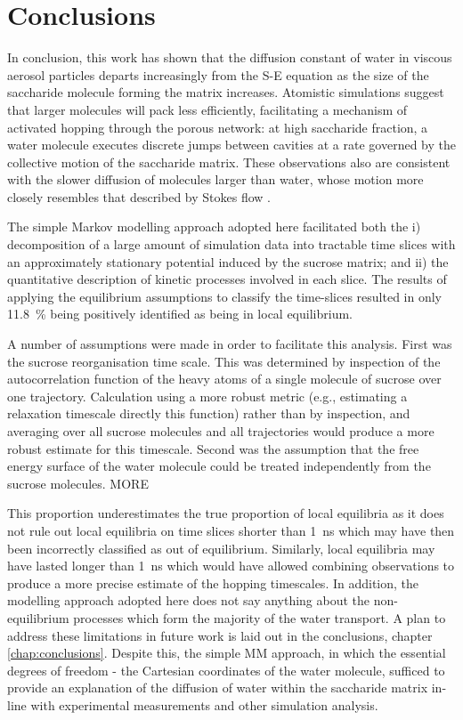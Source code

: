 \section{Conclusions}\label{sec:wat_conclusions}
In conclusion, this work has shown that the diffusion constant of water in viscous aerosol particles departs increasingly from the S-E equation as the size of the saccharide molecule forming the matrix increases. Atomistic simulations suggest that larger molecules will pack less efficiently, facilitating a mechanism of activated hopping through the porous network: at high saccharide fraction, a water molecule executes discrete jumps between cavities at a rate governed by the collective motion of the saccharide matrix. These observations also are consistent with the slower diffusion of molecules larger than water, whose motion more closely resembles that described by Stokes flow \cite{Gonzalez2015}.

The simple Markov modelling approach adopted here facilitated both the i) decomposition of a large amount of simulation data into tractable time slices with an approximately stationary potential induced by the sucrose matrix; and ii) the quantitative description of kinetic processes involved in each slice. The results of applying the equilibrium assumptions to classify the time-slices resulted in only \SI{11.8}{\percent} being positively identified as being in local equilibrium.

A number of assumptions were made in order to facilitate this analysis. First was the sucrose reorganisation time scale. This was determined by inspection of  the  autocorrelation function of the heavy atoms of a single molecule of sucrose over one trajectory. Calculation using a more robust metric (e.g., estimating a relaxation timescale directly this function) rather than by inspection, and averaging over all sucrose molecules and all trajectories would produce a more robust estimate for this timescale.  Second was the assumption that the free energy surface of the water molecule could be treated independently from the sucrose molecules. MORE

This proportion underestimates the true proportion of local equilibria as it does not rule out local equilibria on time slices shorter than \SI{1}{\nano\second} which may have then been incorrectly classified as out of equilibrium. Similarly, local equilibria may have lasted longer than \SI{1}{\nano\second} which would have allowed combining observations to produce a more precise estimate of the hopping timescales. In addition, the modelling approach adopted here does not say anything about the non-equilibrium processes which form the majority of the water transport. A plan to address these limitations in future work is laid out in the conclusions, chapter \ref{chap:conclusions}. Despite this, the simple MM approach, in which the essential degrees of freedom - the Cartesian coordinates of the water molecule, sufficed to provide an explanation of the diffusion of water within the saccharide matrix in-line with experimental measurements and other simulation analysis. 



